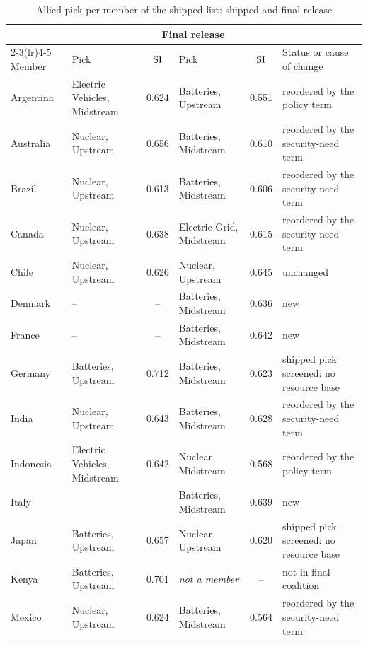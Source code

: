 \begin{table}[htbp]
  \centering
  \begin{threeparttable}
  \caption{Allied pick per member of the shipped list: shipped and final release}
  \label{tab:reconcile_allied}
  \footnotesize
  \begin{tabularx}{\textwidth}{@{}l >{\raggedright\arraybackslash}p{1.15in} c >{\raggedright\arraybackslash}p{1.15in} c >{\raggedright\arraybackslash}X@{}}
    \toprule
    & \multicolumn{2}{c}{Shipped release} & \multicolumn{2}{c}{Final release} & \\
    \cmidrule(lr){2-3}\cmidrule(lr){4-5}
    Member & Pick & $\mathrm{SI}$ & Pick & $\mathrm{SI}$ & Status or cause of change \\
    \midrule
    Argentina & Electric Vehicles, Midstream & 0.624 & Batteries, Upstream & 0.551 & reordered by the policy term \\
    Australia & Nuclear, Upstream & 0.656 & Batteries, Midstream & 0.610 & reordered by the security-need term \\
    Brazil & Nuclear, Upstream & 0.613 & Batteries, Midstream & 0.606 & reordered by the security-need term \\
    Canada & Nuclear, Upstream & 0.638 & Electric Grid, Midstream & 0.615 & reordered by the security-need term \\
    Chile & Nuclear, Upstream & 0.626 & Nuclear, Upstream & 0.645 & unchanged \\
    Denmark & -- & -- & Batteries, Midstream & 0.636 & new \\
    France & -- & -- & Batteries, Midstream & 0.642 & new \\
    Germany & Batteries, Upstream & 0.712 & Batteries, Midstream & 0.623 & shipped pick screened: no resource base \\
    India & Nuclear, Upstream & 0.643 & Batteries, Midstream & 0.628 & reordered by the security-need term \\
    Indonesia & Electric Vehicles, Midstream & 0.642 & Nuclear, Midstream & 0.568 & reordered by the policy term \\
    Italy & -- & -- & Batteries, Midstream & 0.639 & new \\
    Japan & Batteries, Upstream & 0.657 & Nuclear, Upstream & 0.620 & shipped pick screened: no resource base \\
    Kenya & Batteries, Upstream & 0.701 & \emph{not a member} & -- & not in final coalition \\
    Mexico & Nuclear, Upstream & 0.624 & Batteries, Midstream & 0.564 & reordered by the security-need term \\

\end{tabularx}
\end{threeparttable}
\end{table}
